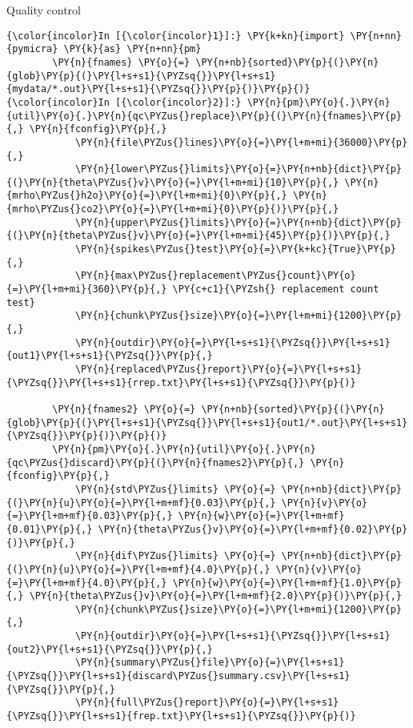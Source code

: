 \begin{block}{Quality control}
    \begin{Verbatim}[commandchars=\\\{\}]
{\color{incolor}In [{\color{incolor}1}]:} \PY{k+kn}{import} \PY{n+nn}{pymicra} \PY{k}{as} \PY{n+nn}{pm}
        \PY{n}{fnames} \PY{o}{=} \PY{n+nb}{sorted}\PY{p}{(}\PY{n}{glob}\PY{p}{(}\PY{l+s+s1}{\PYZsq{}}\PY{l+s+s1}{mydata/*.out}\PY{l+s+s1}{\PYZsq{}}\PY{p}{)}\PY{p}{)}
{\color{incolor}In [{\color{incolor}2}]:} \PY{n}{pm}\PY{o}{.}\PY{n}{util}\PY{o}{.}\PY{n}{qc\PYZus{}replace}\PY{p}{(}\PY{n}{fnames}\PY{p}{,} \PY{n}{fconfig}\PY{p}{,}
            \PY{n}{file\PYZus{}lines}\PY{o}{=}\PY{l+m+mi}{36000}\PY{p}{,}
            \PY{n}{lower\PYZus{}limits}\PY{o}{=}\PY{n+nb}{dict}\PY{p}{(}\PY{n}{theta\PYZus{}v}\PY{o}{=}\PY{l+m+mi}{10}\PY{p}{,} \PY{n}{mrho\PYZus{}h2o}\PY{o}{=}\PY{l+m+mi}{0}\PY{p}{,} \PY{n}{mrho\PYZus{}co2}\PY{o}{=}\PY{l+m+mi}{0}\PY{p}{)}\PY{p}{,}
            \PY{n}{upper\PYZus{}limits}\PY{o}{=}\PY{n+nb}{dict}\PY{p}{(}\PY{n}{theta\PYZus{}v}\PY{o}{=}\PY{l+m+mi}{45}\PY{p}{)}\PY{p}{,}
            \PY{n}{spikes\PYZus{}test}\PY{o}{=}\PY{k+kc}{True}\PY{p}{,}
            \PY{n}{max\PYZus{}replacement\PYZus{}count}\PY{o}{=}\PY{l+m+mi}{360}\PY{p}{,} \PY{c+c1}{\PYZsh{} replacement count test}
            \PY{n}{chunk\PYZus{}size}\PY{o}{=}\PY{l+m+mi}{1200}\PY{p}{,}
            \PY{n}{outdir}\PY{o}{=}\PY{l+s+s1}{\PYZsq{}}\PY{l+s+s1}{out1}\PY{l+s+s1}{\PYZsq{}}\PY{p}{,}
            \PY{n}{replaced\PYZus{}report}\PY{o}{=}\PY{l+s+s1}{\PYZsq{}}\PY{l+s+s1}{rrep.txt}\PY{l+s+s1}{\PYZsq{}}\PY{p}{)}
        
        \PY{n}{fnames2} \PY{o}{=} \PY{n+nb}{sorted}\PY{p}{(}\PY{n}{glob}\PY{p}{(}\PY{l+s+s1}{\PYZsq{}}\PY{l+s+s1}{out1/*.out}\PY{l+s+s1}{\PYZsq{}}\PY{p}{)}\PY{p}{)}
        \PY{n}{pm}\PY{o}{.}\PY{n}{util}\PY{o}{.}\PY{n}{qc\PYZus{}discard}\PY{p}{(}\PY{n}{fnames2}\PY{p}{,} \PY{n}{fconfig}\PY{p}{,}
            \PY{n}{std\PYZus{}limits} \PY{o}{=} \PY{n+nb}{dict}\PY{p}{(}\PY{n}{u}\PY{o}{=}\PY{l+m+mf}{0.03}\PY{p}{,} \PY{n}{v}\PY{o}{=}\PY{l+m+mf}{0.03}\PY{p}{,} \PY{n}{w}\PY{o}{=}\PY{l+m+mf}{0.01}\PY{p}{,} \PY{n}{theta\PYZus{}v}\PY{o}{=}\PY{l+m+mf}{0.02}\PY{p}{)}\PY{p}{,}
            \PY{n}{dif\PYZus{}limits} \PY{o}{=} \PY{n+nb}{dict}\PY{p}{(}\PY{n}{u}\PY{o}{=}\PY{l+m+mf}{4.0}\PY{p}{,} \PY{n}{v}\PY{o}{=}\PY{l+m+mf}{4.0}\PY{p}{,} \PY{n}{w}\PY{o}{=}\PY{l+m+mf}{1.0}\PY{p}{,} \PY{n}{theta\PYZus{}v}\PY{o}{=}\PY{l+m+mf}{2.0}\PY{p}{)}\PY{p}{,}
            \PY{n}{chunk\PYZus{}size}\PY{o}{=}\PY{l+m+mi}{1200}\PY{p}{,}
            \PY{n}{outdir}\PY{o}{=}\PY{l+s+s1}{\PYZsq{}}\PY{l+s+s1}{out2}\PY{l+s+s1}{\PYZsq{}}\PY{p}{,}
            \PY{n}{summary\PYZus{}file}\PY{o}{=}\PY{l+s+s1}{\PYZsq{}}\PY{l+s+s1}{discard\PYZus{}summary.csv}\PY{l+s+s1}{\PYZsq{}}\PY{p}{,}
            \PY{n}{full\PYZus{}report}\PY{o}{=}\PY{l+s+s1}{\PYZsq{}}\PY{l+s+s1}{frep.txt}\PY{l+s+s1}{\PYZsq{}}\PY{p}{)}
\end{Verbatim}
\end{block}


